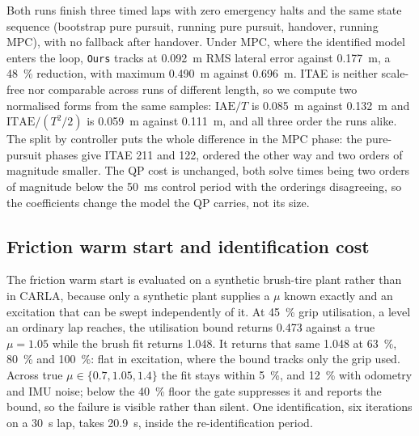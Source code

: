 Both runs finish three timed laps with zero emergency halts and the same state
sequence (bootstrap pure pursuit, running pure pursuit, handover, running MPC),
with no fallback after handover. Under MPC, where the identified model enters
the loop, \texttt{Ours} tracks at \SI{0.092}{\meter} RMS lateral error against
\SI{0.177}{\meter}, a \SI{48}{\percent} reduction, with maximum
\SI{0.490}{\meter} against \SI{0.696}{\meter}. ITAE is neither scale-free nor
comparable across runs of different length, so we compute two normalised forms
from the same samples: $\mathrm{IAE}/T$ is \SI{0.085}{\meter} against
\SI{0.132}{\meter} and $\mathrm{ITAE}/(T^{2}/2)$ is \SI{0.059}{\meter}
against \SI{0.111}{\meter}, and all three order the runs alike. The split by
controller puts the whole difference in the MPC phase: the pure-pursuit phases
give ITAE \num{211} and \num{122}, ordered the other way and two orders of
magnitude smaller. The QP cost is unchanged, both solve times being two orders
of magnitude below the \SI{50}{\milli\second} control period with the orderings
disagreeing, so the coefficients change the model the QP carries, not its
size.

\subsection{Friction warm start and identification cost}
\label{subsec:mu}

The friction warm start is evaluated on a synthetic brush-tire plant rather
than in CARLA, because only a synthetic plant supplies a $\mu$ known exactly
and an excitation that can be swept independently of it. At \SI{45}{\percent}
grip utilisation, a level an ordinary lap reaches, the utilisation bound
returns \num{0.473} against a true $\mu=\num{1.05}$ while the brush fit returns
\num{1.048}. It returns that same \num{1.048} at \SI{63}{\percent},
\SI{80}{\percent} and \SI{100}{\percent}: flat in excitation, where the bound
tracks only the grip used. Across true
$\mu\in\{0.7,1.05,1.4\}$ the fit stays within \SI{5}{\percent}, and
\SI{12}{\percent} with odometry and IMU noise; below the \SI{40}{\percent}
floor the gate suppresses it and reports the bound, so the failure is visible
rather than silent. One identification, six iterations on a \SI{30}{\second}
lap, takes \SI{20.9}{\second}, inside the re-identification period.
